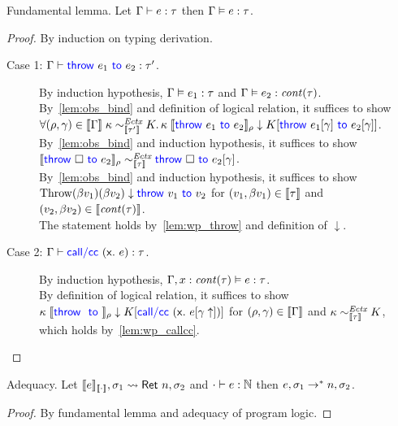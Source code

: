 \begin{lemma}{Fundamental lemma.}
  \label{lem:fundamental}
  \newline
  Let ${\Gamma}\vdash{e}\mathrel{:}{\tau}$
  then $\Gamma \vDash e \mathrel{:} \tau$.
\end{lemma}
\begin{proof}
  By induction on typing derivation.
  \begin{description}
  \item[Case 1: ${\Gamma}\vdash{\mathsf{\color{blue} throw}~{e_1}~\mathsf{\color{blue} to}~{e_2}}\mathrel{:}{\tau'}$.]
    By induction hypothesis, $\Gamma \vDash e_1 \mathrel{:} \tau$ and $\Gamma \vDash e_2 \mathrel{:} \mathit{cont}({\tau})$.\\
    By~\cref{lem:obs_bind} and definition of logical relation, it suffices to show\\
    $\All (\rho, \gamma) \in \sem{\Gamma}\; \kappa \sim_{\sem{\tau'}}^\Ectx K. \eapp{\kappa}{\sem{\throw{\expr_1}{\expr_2}}_\rho} \downarrow \plug{K}{\throw{\plug{\expr_1}{\gamma}}{\plug{\expr_2}{\gamma}}}$.\\
    By~\cref{lem:obs_bind} and induction hypothesis, it suffices to show\\
    $\llbracket{\mathsf{\color{blue} throw}~{\square}~\mathsf{\color{blue} to}~{e_2}}\rrbracket_\rho \sim_{\llbracket{\tau}\rrbracket}^{\textit{Ectx}} \mathsf{\color{blue} throw}~{\square}~\mathsf{\color{blue} to}~{{e_2}[{\gamma}]}$.\\
    By~\cref{lem:obs_bind} and induction hypothesis, it suffices to show\\
    $\mathrm{Throw}(\beta v_1)(\beta v_2) \downarrow \mathsf{\color{blue} throw}~{v_1}~\mathsf{\color{blue} to}~{v_2}$ for $(v_1, \beta v_1) \in \llbracket{\tau}\rrbracket$ and $(v_2, \beta v_2) \in \llbracket{\mathit{cont}({\tau})}\rrbracket$.\\
    The statement holds by~\cref{lem:wp_throw} and definition of $\downarrow$.
  \item[Case 2: ${\Gamma}\vdash{\mathsf{\color{blue} call/cc}~({\mathsf{{x}}}{\mathsf{.}}~{e})}\mathrel{:}{\tau}$.]
    By induction hypothesis, $\Gamma, x \mathrel{:} \mathit{cont}({\tau}) \vDash e \mathrel{:} \tau$.\\
    By definition of logical relation, it suffices to show\\
    ${\kappa}\;{\llbracket{\mathsf{\color{blue} throw}~{}~\mathsf{\color{blue} to}~{}}\rrbracket_\rho} \downarrow {K}[{\mathsf{\color{blue} call/cc}~({\mathsf{{x}}}{\mathsf{.}}~{{e}[{\gamma \uparrow}]})}]$ for $(\rho, \gamma) \in \llbracket{\Gamma}\rrbracket$ and $\kappa \sim_{\llbracket{\tau}\rrbracket}^{\textit{Ectx}} K$,\\
    which holds by~\cref{lem:wp_callcc}.
  \end{description}
\end{proof}

\begin{lemma}{Adequacy.}
  \label{lem:adequacy}
  \newline
  Let $\llbracket{e}\rrbracket_{\llbracket{\cdot}\rrbracket}, \sigma_1 \rightsquigarrow \mathsf{Ret}~n, \sigma_2$ and ${\cdot}\vdash{e}\mathrel{:}{\mathbb{N}}$
  then $e, \sigma_1 \rightarrow^* n, \sigma_2$.
\end{lemma}
\begin{proof}
  By fundamental lemma and adequacy of program logic.
\end{proof}

